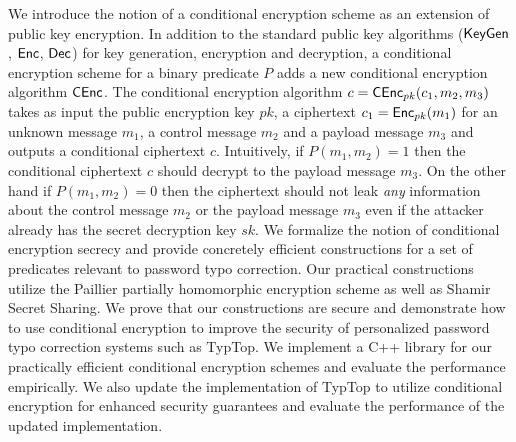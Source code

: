 We introduce the notion of a conditional encryption scheme as an extension of public key encryption. In addition to the standard public key algorithms (${\mathsf{KeyGen}}$, ${\mathsf{Enc}}$, ${\mathsf{Dec}}$) for key generation, encryption and decryption, a conditional encryption scheme for a binary predicate $P$ adds a new conditional encryption algorithm ${\mathsf{C}}{\mathsf{Enc}}$. The conditional encryption algorithm $c={\mathsf{C}}{\mathsf{Enc}}_{pk}(c_1,m_2,m_3)$ takes as input the public encryption key $pk$, a ciphertext $c_1 = {\mathsf{Enc}}_{pk}(m_1)$ for an unknown message $m_1$, a control message $m_2$ and a payload message $m_3$ and outputs a conditional ciphertext $c$. Intuitively, if $P(m_1,m_2)=1$ then the conditional ciphertext $c$ should decrypt to the payload message $m_3$. On the other hand if $P(m_1,m_2) = 0$ then the ciphertext should not leak {\em any} information about the control message $m_2$ or the payload message $m_3$ even if the attacker already has the secret decryption key $sk$. We formalize the notion of conditional encryption secrecy and provide concretely efficient constructions for a set of predicates relevant to password typo correction. Our practical constructions utilize the Paillier partially homomorphic encryption scheme as well as Shamir Secret Sharing. We prove that our constructions are secure and demonstrate how to use conditional encryption to improve the security of personalized password typo correction systems such as TypTop. We implement a C++ library for our practically efficient conditional encryption schemes and evaluate the performance empirically. We also update the implementation of TypTop to utilize conditional encryption for enhanced security guarantees and evaluate the performance of the updated implementation.  
